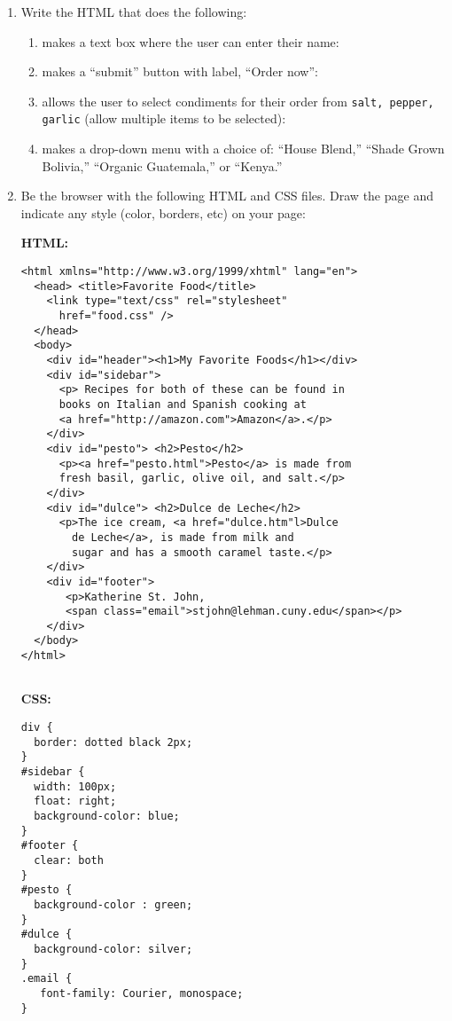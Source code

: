 {{\begin{enumerate}

    \item Write the HTML that does the following:
    	\begin{enumerate}
		\item makes a text box where the user can enter their name:
			\vspace{.5in}
		\item makes a ``submit'' button with label, ``Order now'':
			\vspace{.5in}
		\item allows the user to select condiments for their order from
			{\tt salt, pepper, garlic} (allow multiple items to be selected):
			\vspace{1.5in}
		\item makes a drop-down menu with a choice of:  ``House Blend,''
			``Shade Grown Bolivia,'' ``Organic Guatemala,'' or ``Kenya.''
	\end{enumerate}

\newpage


     \item Be the browser with the following HTML and CSS files.  Draw the page
     and indicate any style (color, borders, etc) on your page:

{\small     
     \begin{center}

        \begin{minipage}[t]{0.7\linewidth}
         {\bf HTML:}
  {\footnotesize
        \begin{verbatim}
<html xmlns="http://www.w3.org/1999/xhtml" lang="en">
  <head> <title>Favorite Food</title>
    <link type="text/css" rel="stylesheet" 
      href="food.css" />
  </head>
  <body>
    <div id="header"><h1>My Favorite Foods</h1></div>
    <div id="sidebar">
      <p> Recipes for both of these can be found in 
      books on Italian and Spanish cooking at 
      <a href="http://amazon.com">Amazon</a>.</p>
    </div>
    <div id="pesto"> <h2>Pesto</h2>
      <p><a href="pesto.html">Pesto</a> is made from 
      fresh basil, garlic, olive oil, and salt.</p>
    </div>
    <div id="dulce"> <h2>Dulce de Leche</h2>
      <p>The ice cream, <a href="dulce.htm"l>Dulce
        de Leche</a>, is made from milk and 
        sugar and has a smooth caramel taste.</p>
    </div>
    <div id="footer">
       <p>Katherine St. John, 
       <span class="email">stjohn@lehman.cuny.edu</span></p>
    </div>
  </body>
</html>
 
        \end{verbatim}
        }
        \end{minipage}
        \hfill
        \begin{minipage}[t]{0.25\linewidth}
        {\bf CSS:}
\begin{verbatim}
div { 
  border: dotted black 2px;
}
#sidebar {
  width: 100px;
  float: right;
  background-color: blue;
}
#footer {
  clear: both
}
#pesto {
  background-color : green;
}
#dulce {
  background-color: silver;
}
.email {
   font-family: Courier, monospace;
}
\end{verbatim}
        \end{minipage}    	
	

\end{center}}
\end{enumerate}}}
